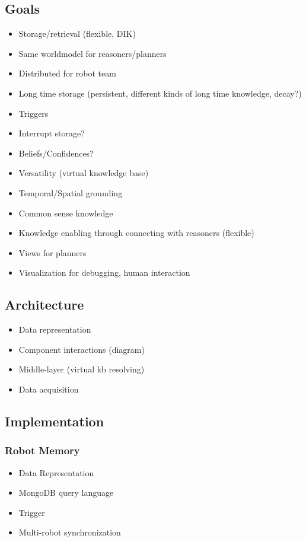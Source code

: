 \documentclass[a4paper,11pt]{article}
\begin{document}
\subsection{Goals}
\label{sec:goals}
\begin{itemize}
\item Storage/retrieval (flexible, DIK)
\item Same worldmodel for reasoners/planners
\item Distributed for robot team
\item Long time storage (persistent, different kinds of long time knowledge, decay?)
\item Triggers
\item Interrupt storage?
\item Beliefs/Confidences?
\item Versatility (virtual knowledge base)
\item Temporal/Spatial grounding
\item Common sense knowledge
\item Knowledge enabling through connecting with reasoners (flexible)
\item Views for planners
\item Visualization for debugging, human interaction
\end{itemize}
\subsection{Architecture}
\label{sec:arch}
\begin{itemize}
\item Data representation
\item Component interactions (diagram)
\item Middle-layer (virtual kb resolving)
\item Data acquisition
\end{itemize}


\subsection{Implementation}
\label{sec:impl}
\subsubsection{Robot Memory}
\label{sec:impl-memory}
\begin{itemize}
\item Data Representation
\item MongoDB query language
\item Trigger
\item Multi-robot synchronization
\end{itemize}
\end{document}
